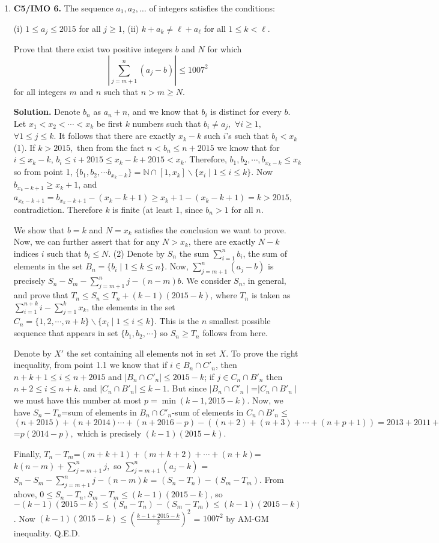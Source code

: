 \documentclass[11pt,a4paper]{article}
\begin{document}
\begin{enumerate}
\item\textbf{C5/IMO 6.} The sequence $a_1,a_2,\dots$ of integers satisfies the conditions:

(i) $1\le a_j\le2015$ for all $j\ge1$,
(ii) $k+a_k\neq \ell+a_\ell$ for all $1\le k<\ell$.

Prove that there exist two positive integers $b$ and $N$ for which\[\left\vert\sum_{j=m+1}^n(a_j-b)\right\vert\le1007^2\]for all integers $m$ and $n$ such that $n>m\ge N$.

\textbf{Solution.} Denote $b_n$ as $a_n+n$, and we know that $b_i$ is distinct for every $b$. Let $x_1< x_2<\cdots <x_k$ be first $k$ numbers such that $b_i\ne a_j,$ $\forall i\ge 1,$ $\forall1\le j\le k$. It follows that there are exactly $x_k-k$ such $i$'s such that $b_i<x_k$ (1). If $k>2015,$ then from the fact $n<b_n\le n+2015$ we know that for $i\le x_k-k$, $b_i\le i+2015\le x_k-k+2015<x_k$. Therefore, $b_1, b_2,\cdots ,b_{x_k-k}\le x_k$ so from point 1, $\{b_1, b_2,\cdots b_{x_k-k}\}=\mathbb{N}\cap [1, x_k]\backslash \{x_i\mid 1\le i\le k\}$. Now $b_{x_k-k+1}\ge x_k+1$, and $a_{x_k-k+1}=b_{x_k-k+1}-(x_k-k+1)\ge x_k+1-(x_k-k+1)=k>2015$, contradiction. Therefore $k$ is finite (at least 1, since $b_n>1$ for all $n$.

We show that $b=k$ and $N=x_k$ satisfies the conclusion we want to prove. Now, we can further assert that for any $N>x_k$, there are exactly $N-k$ indices $i$ such that $b_i\le N$. (2) Denote by $S_n$ the sum $\sum_{i=1}^{n} b_i$, the sum of elements in the set $B_n=\{b_i\mid 1\le k\le n\}$. Now, $\sum_{j=m+1}^n(a_j-b)$ is precisely $S_n-S_m-\sum_{j=m+1}^n j-(n-m)b$. We consider $S_n$, in general, and prove that $T_n\le S_n\le T_n+(k-1)(2015-k)$, where $T_n$ is taken as $\sum_{i=1}^{n+k} i-\sum_{j=1}^{k} x_k$, the elements in the set $C_n=\{1,2,\cdots, n+k\}\backslash \{x_i\mid 1\le i\le k\}$. This is the $n$ smallest possible sequence that appears in set $\{b_1, b_2,\cdots \}$ so $S_n\ge T_n$ follows from here.

Denote by $X'$ the set containing all elements not in set $X$. To prove the right inequality, from point 1.1 we know that if $i\in B_n\cap C'_n$, then $n+k+1\le i\le n+2015$ and $\mid B_n\cap C'_n\mid\le 2015-k$; if $j\in C_n\cap B'_n$ then $n+2\le i\le n+k.$ and $\mid C_n\cap B'_n\mid\le k-1$. But since $\mid B_n\cap C'_n\mid$=$\mid C_n\cap B'_n\mid$ we must have this number at most $p=\min(k-1, 2015-k)$. Now, we have $S_n-T_n$=sum of elements in $B_n\cap C'_n$-sum of elements in $C_n\cap B'_n\le$ $(n+2015)+(n+2014)\cdots +(n+2016-p)-((n+2)+(n+3)+\cdots +(n+p+1))=2013+2011+\cdots +(2013-2(p-1))=\frac{p}{2}\cdot (4028-2p)$=$p(2014-p),$ which is precisely $(k-1)(2015-k)$.

Finally, $T_n-T_m$=$(m+k+1)+(m+k+2)+\cdots +(n+k)$=$k(n-m)+\sum_{j=m+1}^n j,$ so $\sum_{j=m+1}^n(a_j-k)$ = $S_n-S_m-\sum_{j=m+1}^n j-(n-m)k$ = $(S_n-T_n)-(S_m-T_m)$. From above, $0\le S_n-T_n, S_m-T_m\le (k-1)(2015-k)$, so $-(k-1)(2015-k)\le (S_n-T_n)-(S_m-T_m)\le (k-1)(2015-k)$. Now $(k-1)(2015-k)\le(\frac{k-1+2015-k}{2})^{2}$ = $1007^2$ by AM-GM inequality. Q.E.D.

\end{enumerate}
\end{document}
